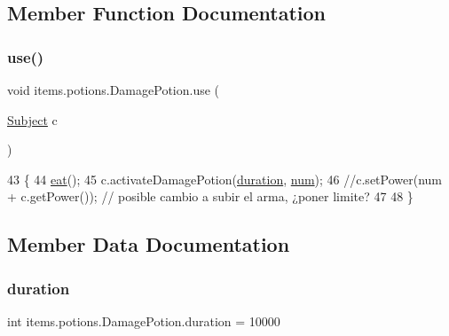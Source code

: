 \subsection{Member Function Documentation}
\mbox{\label{classitems_1_1potions_1_1_damage_potion_a5ad48837266e61f13c6c1d2ac7321133}} 
\subsubsection{\texorpdfstring{use()}{use()}}
{\footnotesize\ttfamily void items.\+potions.\+Damage\+Potion.\+use (\begin{DoxyParamCaption}\item[{\mbox{\hyperlink{classentities_1_1_subject}{Subject}}}]{c }\end{DoxyParamCaption})\hspace{0.3cm}{\ttfamily [inline]}}


\begin{DoxyCode}
43                                \{
44         \mbox{\hyperlink{classitems_1_1_potion_a33ab3390826ef43ddfa94fc812e53afe}{eat}}();
45         c.activateDamagePotion(\mbox{\hyperlink{classitems_1_1potions_1_1_damage_potion_a0d769ebd1b8063daafe958a488fb4174}{duration}}, \mbox{\hyperlink{classitems_1_1potions_1_1_damage_potion_a0278c2e62e2d1bea2ee348110474d812}{num}});
46         \textcolor{comment}{//c.setPower(num + c.getPower()); // posible cambio a subir el arma, ¿poner limite?}
47 
48     \}
\end{DoxyCode}


\subsection{Member Data Documentation}
\mbox{\label{classitems_1_1potions_1_1_damage_potion_a0d769ebd1b8063daafe958a488fb4174}} 
\subsubsection{\texorpdfstring{duration}{duration}}
{\footnotesize\ttfamily int items.\+potions.\+Damage\+Potion.\+duration = 10000\hspace{0.3cm}{\ttfamily [private]}}

